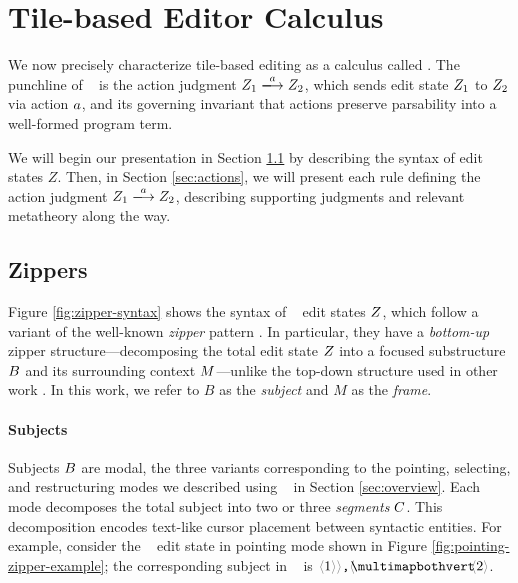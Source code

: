 \section{Tile-based Editor Calculus}\label{sec:formalism-2}

We now precisely characterize tile-based editing
as a calculus called \ty.
The punchline of \ty~ is the action judgment
$\performAction{\editState_1}{\action}{\editState_2}$,
which sends edit state $Z_1$ to $Z_2$
via action $a$, and its governing invariant
that actions preserve parsability into a well-formed
program term.

We will begin our presentation in Section \ref{sec:zippers}
by describing the syntax of edit states $Z$.
Then, in Section \ref{sec:actions}, we will present each rule
defining the action judgment
$\performAction{\editState_1}{\action}{\editState_2}$,
describing supporting judgments and relevant metatheory
along the way.

\subsection{Zippers} \label{sec:zippers}



Figure \ref{fig:zipper-syntax} shows the syntax of \ty~ edit states $Z$,
which follow a variant of the well-known
\emph{zipper} pattern \cite{zipper}.
In particular, they have a \emph{bottom-up} zipper
structure---decomposing the total edit state $Z$ into a
focused substructure $B$ and its surrounding context
$M$---unlike the top-down structure used in other
work \cite{Hazelnut}.
In this work, we refer to $B$ as the \emph{subject} and $M$
as the \emph{frame}.

\paragraph{Subjects}
Subjects $B$ are modal, the three
variants corresponding to the pointing, selecting,
and restructuring modes we described using \tylr~
in Section \ref{sec:overview}.
Each mode decomposes the total subject into two
or three \emph{segments} $C$.
This decomposition encodes text-like cursor
placement between syntactic entities.
For example, consider the \tylr~ edit state
in pointing mode shown in Figure \ref{fig:pointing-zipper-example};
the corresponding subject in \ty~ is
$\pointing{\optile{\snumlit{1}}\bintile{\tprod}}{\optile{\snumlit{2}}}$.


